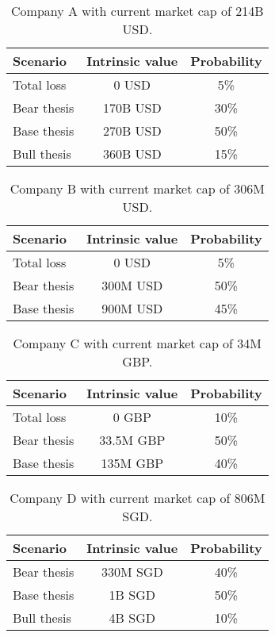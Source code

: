 \documentclass{article}
\begin{document}
\begin{table}[!ht]
\caption{Company A with current market cap of 214B USD.}
\vspace{0.25cm}
\centering
\begin{tabular}{l|c|c}
Scenario & Intrinsic value & Probability \\
\hline
Total loss & 0 USD & 5\% \\
Bear thesis & 170B USD & 30\% \\
Base thesis & 270B USD & 50\% \\
Bull thesis & 360B USD & 15\% \\
\end{tabular}%
\label{tab:companyA}%
\end{table}%

\begin{table}[!ht]
\caption{Company B with current market cap of 306M USD.}
\vspace{0.25cm}
\centering
\begin{tabular}{l|c|c}
Scenario & Intrinsic value & Probability \\
\hline
Total loss& 0 USD & 5\% \\
Bear thesis & 300M USD & 50\% \\
Base thesis & 900M USD & 45\% \\
\end{tabular}%
\label{tab:companyB}%
\end{table}%

\begin{table}[!ht]
\caption{Company C with current market cap of 34M GBP.}
\vspace{0.25cm}
\centering
\begin{tabular}{l|c|c}
Scenario & Intrinsic value & Probability \\
\hline
Total loss & 0 GBP & 10\% \\
Bear thesis & 33.5M GBP & 50\% \\
Base thesis & 135M GBP & 40\% \\
\end{tabular}%
\label{tab:companyC}%
\end{table}%

\begin{table}[!ht]
\caption{Company D with current market cap of 806M SGD.}
\vspace{0.25cm}
\centering
\begin{tabular}{l|c|c}
Scenario & Intrinsic value & Probability \\
\hline
Bear thesis & 330M SGD & 40\% \\
Base thesis & 1B SGD & 50\% \\
Bull thesis & 4B SGD & 10\% \\
\end{tabular}%
\label{tab:companyD}%
\end{table}%
\end{document}
